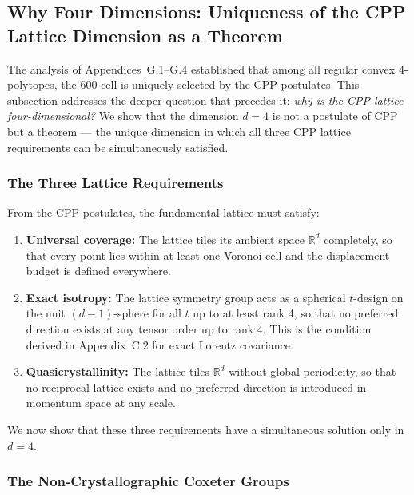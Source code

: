 \documentclass[11pt,letterpaper]{article}
\begin{document}
\subsection{Why Four Dimensions: Uniqueness of the CPP Lattice 
Dimension as a Theorem}
\label{app:G5}

The analysis of Appendices~G.1--G.4 established that among all regular 
convex 4-polytopes, the 600-cell is uniquely selected by the CPP 
postulates. This subsection addresses the deeper question that precedes 
it: \emph{why is the CPP lattice four-dimensional?} We show that the 
dimension $d = 4$ is not a postulate of CPP but a theorem — the unique 
dimension in which all three CPP lattice requirements can be 
simultaneously satisfied.

\subsubsection{The Three Lattice Requirements}

From the CPP postulates, the fundamental lattice must satisfy:

\begin{enumerate}
\item \textbf{Universal coverage:} The lattice tiles its ambient 
space $\mathbb{R}^d$ completely, so that every point lies within 
at least one Voronoi cell and the displacement budget is defined 
everywhere.

\item \textbf{Exact isotropy:} The lattice symmetry group acts as a 
spherical $t$-design on the unit $(d-1)$-sphere for all $t$ up to 
at least rank 4, so that no preferred direction exists at any tensor 
order up to rank 4. This is the condition derived in Appendix~C.2 
for exact Lorentz covariance.

\item \textbf{Quasicrystallinity:} The lattice tiles $\mathbb{R}^d$ 
without global periodicity, so that no reciprocal lattice exists and 
no preferred direction is introduced in momentum space at any scale.
\end{enumerate}

We now show that these three requirements have a simultaneous solution 
only in $d = 4$.

\subsubsection{The Non-Crystallographic Coxeter Groups}
\end{document}
